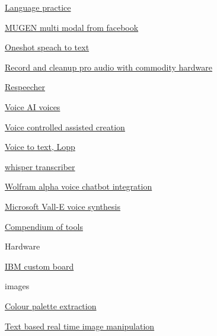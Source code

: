         \href{https://huggingface.co/spaces/JavaFXpert/Chat-GPT-LangChain}{Language
        practice}
       
        \href{https://mugen-org.github.io/}{MUGEN multi modal from
        facebook}
       
        \href{https://atosystem.github.io/blogs/speechclip}{Oneshot
        speach to text}
       
        \href{https://podcastle.ai/}{Record and cleanup pro audio with
        commodity hardware}
       
        \href{https://variety.com/2022/digital/news/james-earl-jones-darth-vader-retiring-star-wars-ai-1235382827/}{Respeecher}
       
        \href{https://voice.ai/}{Voice AI voices}
       
        \href{https://the-decoder.com/developer-combines-stable-diffusion-whisper-and-gpt-3-for-a-futuristic-design-assistant/}{Voice
        controlled assisted creation}
       
        \href{https://blog.lopp.net/open-source-transcription-software-comparisons/}{Voice
        to text, Lopp}
       
        \href{https://github.com/modal-labs/modal-examples/tree/main/misc/whisper_pod_transcriber}{whisper
        transcriber}
       
        \href{https://huggingface.co/spaces/JavaFXpert/Chat-GPT-LangChain}{Wolfram
        alpha voice chatbot integration}
       
        \href{https://valle-demo.github.io/}{Microsoft Vall-E voice
        synthesis}
       
     
      \href{https://www.futurepedia.io/}{Compendium of tools}
     
      Hardware

       
      \tightlist
       
        \href{https://www.marktechpost.com/2022/10/27/ibm-research-introduces-artificial-intelligence-unit-aiu-its-first-complete-system-on-chip-designed-to-run-and-train-deep-learning-models-faster-and-more-efficiently-than-a-general-purpose-cpu/}{IBM
        custom board}
       
     
      images

       
      \tightlist
       
        \href{https://github.com/mattdesl/gifenc}{Colour palette
        extraction}
       
        \href{https://arxiv.org/abs/2210.09276}{Text based real time
        image manipulation}
       
